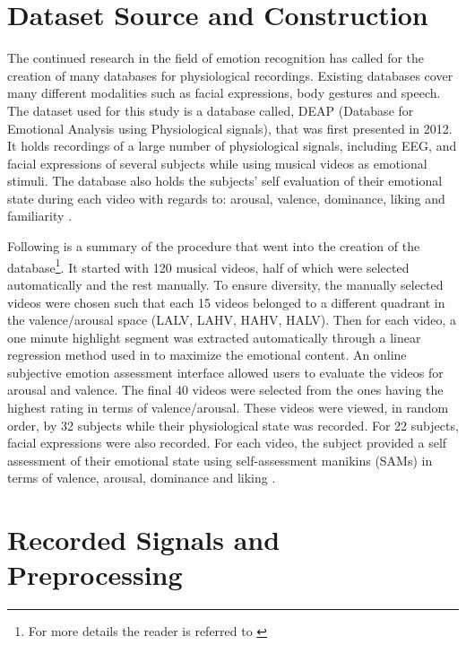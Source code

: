 \documentclass[12pt, a4paper, fleqn]{memoir}%
\begin{document}
\section{Dataset Source and Construction}
\label{sec:DatasetSource}
The continued research in the field of emotion recognition has called for the creation of many databases for physiological recordings. Existing databases cover many different modalities such as facial expressions, body gestures and speech. The dataset used for this study is a database called, DEAP (Database for Emotional Analysis using Physiological signals), that was first presented in 2012. It holds recordings of a large number of physiological signals, including EEG, and facial expressions of several subjects while using musical videos as emotional stimuli. The database also holds the subjects' self evaluation of their emotional state during each video with regards to: arousal, valence, dominance, liking and familiarity \cite{koelstra2012deap}.

Following is a summary of the procedure that went into the creation of the database\footnote{For more details the reader is referred to \cite{koelstra2012deap}}. It started with 120 musical videos, half of which were selected automatically and the rest manually. To ensure diversity, the manually selected videos were chosen such that each 15 videos belonged to a different quadrant in the valence/arousal space (LALV, LAHV, HAHV, HALV). Then for each video, a one minute highlight segment was extracted automatically through a linear regression method used in \cite{soleymani2009bayesian} to maximize the emotional content. An online subjective emotion assessment interface allowed users to evaluate the videos for arousal and valence. The final 40 videos were selected from the ones having the highest rating in terms of valence/arousal. These videos were viewed, in random order, by 32 subjects while their physiological state was recorded. For 22 subjects, facial expressions were also recorded. For each video, the subject provided a self assessment of their emotional state using self-assessment manikins (SAMs) in terms of valence, arousal, dominance and liking \cite{koelstra2012deap}.

\section{Recorded Signals and Preprocessing}
\label{sec:preprocessing}
\end{document}

